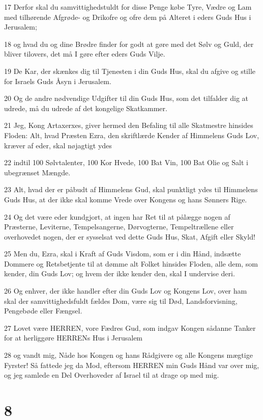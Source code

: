 \par 17 Derfor skal du samvittighedstuldt for disse Penge købe Tyre, Vædre og Lam med tilhørende Afgrøde- og Drikofre og ofre dem på Alteret i eders Guds Hus i Jerusalem;
\par 18 og hvad du og dine Brødre finder for godt at gøre med det Sølv og Guld, der bliver tilovers, det må I gøre efter eders Guds Vilje.
\par 19 De Kar, der skænkes dig til Tjenesten i din Guds Hus, skal du afgive og stille for Israels Guds Åsyn i Jerusalem.
\par 20 Og de andre nødvendige Udgifter til din Guds Hus, som det tilfalder dig at udrede, må du udrede af det kongelige Skatkammer.
\par 21 Jeg, Kong Artaxerxes, giver hermed den Befaling til alle Skatmestre hinsides Floden: Alt, hvad Præsten Ezra, den skriftlærde Kender af Himmelens Guds Lov, kræver af eder, skal nøjagtigt ydes
\par 22 indtil 100 Sølvtalenter, 100 Kor Hvede, 100 Bat Vin, 100 Bat Olie og Salt i ubegrænset Mængde.
\par 23 Alt, hvad der er påbudt af Himmelens Gud, skal punktligt ydes til Himmelens Guds Hus, at der ikke skal komme Vrede over Kongens og hans Sønners Rige.
\par 24 Og det være eder kundgjort, at ingen har Ret til at pålægge nogen af Præsterne, Leviterne, Tempelsangerne, Dørvogterne, Tempeltrællene eller overhovedet nogen, der er sysselsat ved dette Guds Hus, Skat, Afgift eller Skyld!
\par 25 Men du, Ezra, skal i Kraft af Guds Visdom, som er i din Hånd, indsætte Dommere og Retsbetjente til at dømme alt Folket hinsides Floden, alle dem, som kender, din Guds Lov; og hvem der ikke kender den, skal I undervise deri.
\par 26 Og enhver, der ikke handler efter din Guds Lov og Kongens Lov, over ham skal der samvittighedsfuldt fældes Dom, være sig til Død, Landsforvisning, Pengebøde eller Fængsel.
\par 27 Lovet være HERREN, vore Fædres Gud, som indgav Kongen sådanne Tanker for at herliggøre HERRENs Hus i Jerusalem
\par 28 og vandt mig, Nåde hos Kongen og hans Rådgivere og alle Kongens mægtige Fyrster! Så fattede jeg da Mod, eftersom HERREN min Guds Hånd var over mig, og jeg samlede en Del Overhoveder af Israel til at drage op med mig.

\chapter{8}

